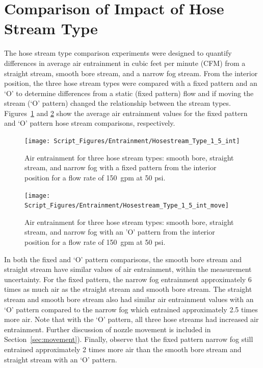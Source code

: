 \documentclass[12pt,oneside]{book}
\begin{document}
\section{Comparison of Impact of Hose Stream Type}

The hose stream type comparison experiments were designed to quantify differences in average air entrainment in cubic feet per minute (CFM) from a straight stream, smooth bore stream, and a narrow fog stream. From the interior position, the three hose stream types were compared with a fixed pattern and an `O' to determine differences from a static (fixed pattern) flow and if moving the stream (`O' pattern) changed the relationship between the stream types. Figures~\ref{fig:hosestream_type} and \ref{fig:hosestream_type_o} show the average air entrainment values for the fixed pattern and `O' pattern hose stream comparisons, respectively.

\begin{figure}[!ht]
	\centering
	\texttt{[image: Script\_Figures/Entrainment/Hosestream\_Type\_1\_5\_int]}
	\caption[Air Entrainment Comparison of Hose Stream Type Fixed Pattern]{Air entrainment for three hose stream types: smooth bore, straight stream, and narrow fog with a fixed pattern from the interior position for a flow rate of 150~gpm at 50 psi.}
	\label{fig:hosestream_type}
\end{figure}


\begin{figure}[!ht]
	\centering
	\texttt{[image: Script\_Figures/Entrainment/Hosestream\_Type\_1\_5\_int\_move]}
	\caption[Air Entrainment Comparison of Hose Stream Type 'O' Pattern]{Air entrainment for three hose stream types: smooth bore, straight stream, and narrow fog with an 'O' pattern from the interior position for a flow rate of 150~gpm at 50 psi.}
	\label{fig:hosestream_type_o}
\end{figure}


In both the fixed and `O' pattern comparisons, the smooth bore stream and straight stream have similar values of air entrainment, within the measurement uncertainty. For the fixed pattern, the narrow fog entrainment approximately 6 times as much air as the straight stream and smooth bore stream. The straight stream and smooth bore stream also had similar air entrainment values with an `O' pattern compared to the narrow fog which entrained approximately 2.5 times more air. Note that with the `O' pattern, all three hose streams had increased air entrainment. Further discussion of nozzle movement is included in Section~\ref{sec:movement}). Finally, observe that the fixed pattern narrow fog still entrained approximately 2 times more air than the smooth bore stream and straight stream with an `O' pattern.
\end{document}
